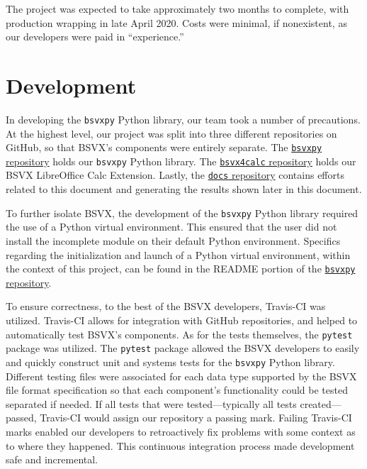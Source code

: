 \documentclass[10pt]{article}
\begin{document}
\indent{}
The project was expected to take approximately two months to complete, with production wrapping in late April 2020.
Costs were minimal, if nonexistent, as our developers were paid in “experience.”

\section*{Development}

In developing the \texttt{bsvxpy} Python library, our team took a number of precautions.
At the highest level, our project was split into three different repositories on GitHub, so that BSVX's components were entirely separate.
The \href{https://github.com/bsvx/bsvxpy}{\texttt{bsvxpy} repository} holds our \texttt{bsvxpy} Python library.
The \href{https://github.com/bsvx/bsvx4calc}{\texttt{bsvx4calc} repository} holds our BSVX LibreOffice Calc Extension.
Lastly, the \href{https://github.com/bsvx/docs}{\texttt{docs} repository} contains efforts related to this document and generating the results shown later in this document.

\indent{}
To further isolate BSVX, the development of the \texttt{bsvxpy} Python library required the use of a Python virtual environment.
This ensured that the user did not install the incomplete module on their default Python environment.
Specifics regarding the initialization and launch of a Python virtual environment, within the context of this project, can be found in the README portion of the \href{https://github.com/bsvx/bsvxpy}{\texttt{bsvxpy} repository}.

\indent{}
To ensure correctness, to the best of the BSVX developers, Travis-CI was utilized.
Travis-CI allows for integration with GitHub repositories, and helped to automatically test BSVX's components.
As for the tests themselves, the \texttt{pytest} package was utilized.
The \texttt{pytest} package allowed the BSVX developers to easily and quickly construct unit and systems tests for the \texttt{bsvxpy} Python library.
Different testing files were associated for each data type supported by the BSVX file format specification so that each component's functionality could be tested separated if needed.
If all tests that were tested---typically all tests created---passed, Travis-CI would assign our repository a passing mark.
Failing Travis-CI marks enabled our developers to retroactively fix problems with some context as to where they happened.
This continuous integration process made development safe and incremental.
\end{document}
